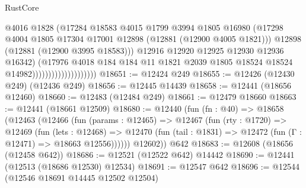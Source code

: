 \begin{lexlean}{RustCore}
\begin{coremodule}
                                            @4016
                                            @1828
                                            (@17284
                                              @18583
                                              @4015
                                              @1799
                                              @3994
                                              @1805
                                              @16980
                                              (@17298
                                                @4004
                                                @1805
                                                @17304
                                                @17001
                                                @12898
                                                (@12881 (@12900 @4005 @1821)))
                                              @12898
                                              (@12881 (@12900 @3995 @18583)))
                                            @12916
                                            @12920
                                            @12925
                                            @12930
                                            @12936
                                            @16342)
                                          (@17976
                                            @4018
                                            @184
                                            @184
                                            @11
                                            @1821
                                            @2039
                                            @1805
                                            @18524
                                            @18524
                                            @14982))))))))))))))))))))
@18651 := @12424 @249
@18655 := @12426 (@12430 @249) (@12436 @249)
@18656 := @12445 @14439
@18658 := @12441 (@18656 @12460)
@18660 := @12483 (@12484 @249)
@18661 := @12479 @18660
@18663 := @12441 (@18661 @12509)
@18680 := @12440
    (fun (fn : @40) =>
    @18658
      (@12463
        (@12466
          (fun (params : @12465) =>
          @12467
            (fun (rty : @1720) =>
            @12469
              (fun (lets : @12468) =>
              @12470 (fun (tail : @1831) => @12472 (fun (Γ : @12471) => @18663 @12556))))))
        @12602))
    @642
@18683 := @12608 (@18656 (@12458 @642))
@18686 := @12521 (@12522 @642) @14442
@18690 := @12441 (@12513 (@18686 @12530) @12534)
@18691 := @12547 @642
@18696 := @12544 (@12546 @18691 @14445 @12502 @12504)

\end{coremodule}
\end{lexlean}

